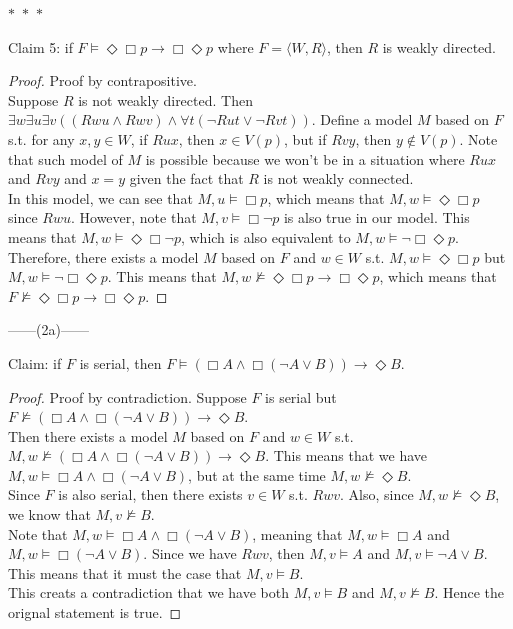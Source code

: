\documentclass[12pt]{article}
\newcommand{\B}{\Box}
\newcommand{\D}{\Diamond}
\newcommand{\s}{\vDash}
\newcommand{\ns}{\nvDash}
\begin{document}
\noindent
\begin{center}
    $\ast$~$\ast$~$\ast$
\end{center}
Claim 5: if $F \vDash \D \B p \to \B \D p$ where $F = \langle W, R \rangle$, then $R$ is weakly directed. 
\begin{proof} Proof by contrapositive.\\
    Suppose $R$ is not weakly directed.
    Then $\exists w \exists u \exists v ((Rwu \land Rwv) \land \forall t(\neg Rut \lor \neg Rvt))$.
    Define a model $M$ based on $F$ s.t. for any $x, y \in W$, if $Rux$, then $x \in V(p)$, but if $Rvy$, then $y \notin V(p)$.
    Note that such model of $M$ is possible because we won't be in a situation where $Rux$ and $Rvy$ and $x = y$ given the fact that $R$ is not weakly connected.\\
    In this model, we can see that $M, u \s \B p$, which means that $M, w \s \D \B p$ since $Rwu$.
    However, note that $M, v \s \B \neg p$ is also true in our model. 
    This means that $M, w \s \D \B \neg p$, which is also equivalent to $M, w \s \neg \B \D p$.\\
    Therefore, there exists a model $M$ based on $F$ and $w \in W$ s.t. $M, w \s \D \B p$ but $M, w \s \neg \B \D p$.
    This means that $M, w \ns \D \B p \to \B \D p$, which means that $F \ns \D \B p \to \B \D p$.

\end{proof}

\newpage
\noindent
\begin{center}
    ------(2a)------
\end{center}
Claim: if $F$ is serial, then $F \s (\B A \land \B (\neg A \lor B)) \to \D B$.
\begin{proof} Proof by contradiction.
    Suppose $F$ is serial but $F \ns (\B A \land \B (\neg A \lor B)) \to \D B$.\\
    Then there exists a model $M$ based on $F$ and $w \in W$ s.t. $M, w \ns (\B A \land \B (\neg A \lor B)) \to \D B$.
    This means that we have $M, w \s \B A \land \B (\neg A \lor B)$, but at the same time $M, w \ns \D B$.\\
    Since $F$ is also serial, then there exists $v \in W$ s.t. $Rwv$. 
    Also, since $M, w \ns \D B$, we know that $M, v \ns B$.\\
    Note that $M, w \s \B A \land \B (\neg A \lor B)$, meaning that $M, w \s \B A$ and $M, w \s \B (\neg A \lor B)$. 
    Since we have $Rwv$, then $M, v \s A$ and $M, v \s \neg A \lor B$.
    This means that it must the case that $M, v \s B$.\\
    This creats a contradiction that we have both $M,v \s B$ and $M, v \ns B$.
    Hence the orignal statement is true.
\end{proof}
\end{document}
